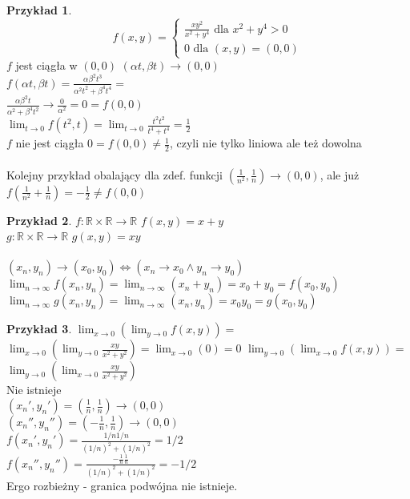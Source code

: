 \documentclass{article}
\theoremstyle{definition}
\theoremstyle{definition}
\theoremstyle{definition}
\newtheorem{pk}{Przykład}[subsection]
\theoremstyle{definition}
\theoremstyle{definition}
\theoremstyle{definition}
\theoremstyle{definition}
\begin{document}
\begin{pk}
    $$f(x,y)=\begin{cases}
        \frac{xy^2}{x^2+y^4} \text{ dla } x^2 + y^4 > 0\\
        0 \text { dla } (x,y) = (0,0)
    \end{cases}$$
    $f$ jest ciągła w $(0,0)$ $(\alpha t, \beta t) \rightarrow (0,0)$\\
    $f(\alpha t, \beta t) = \frac{\alpha \beta^2 t^3}{\alpha^2 t^2 + \beta^4 t^4}=$\\
    $\frac{\alpha \beta^2 t}{\alpha^2 + \beta^4 t^2} \rightarrow \frac{0}{\alpha^2} = 0 = f(0,0)$\\
    $\lim_{t\rightarrow 0} f(t^2,t) = \lim_{t\rightarrow 0} \frac{t^2 t^2}{t^4 + t^4} = \frac{1}{2}$\\
    $f$ nie jest ciągła $0=f(0,0)\neq \frac{1}{2}$, czyli nie tylko liniowa ale też dowolna\\\\
    Kolejny przykład obalający dla zdef. funkcji $\left(\frac{1}{n^2} , \frac{1}{n}\right) \rightarrow (0,0)$, ale już\\
    $f\left(\frac{1}{n^2} + \frac{1}{n}\right) = - \frac{1}{2} \neq f(0,0)$
\end{pk}

\begin{pk}
    $f: \mathbb{R} \times \mathbb{R} \rightarrow \mathbb{R}$
    $f(x,y) = x+y$\\
    $g: \mathbb{R} \times \mathbb{R} \rightarrow \mathbb{R}$
    $g(x,y) = xy$\\\\
    $(x_n,y_n) \rightarrow (x_0, y_0) \iff (x_n\rightarrow x_0 \land y_n \rightarrow y_0)$\\
    $\lim_{n\rightarrow \infty} f(x_n, y_n) = \lim_{n\rightarrow \infty} (x_n + y_n) = x_0 + y_0 = f(x_0, y_0)$\\
    $\lim_{n\rightarrow \infty} g(x_n, y_n) = \lim_{n\rightarrow \infty} (x_n, y_n) = x_0 y_0 = g(x_0, y_0)$\\
\end{pk}

\begin{pk}
    $\lim_{x\rightarrow 0} (\lim_{y\rightarrow 0} f(x,y)) =$\\
    $\lim_{x\rightarrow 0} (\lim_{y\rightarrow 0} \frac{xy}{x^2+y^2}) = \lim_{x\rightarrow 0} (0) = 0$
    $\lim_{y\rightarrow 0} (\lim_{x\rightarrow 0} f(x,y)) =$\\
    $\lim_{y\rightarrow 0} (\lim_{x\rightarrow 0} \frac{xy}{x^2+y^2})$\\
    Nie istnieje\\
    $(x_n', y_n') = (\frac{1}{n}, \frac{1}{n}) \rightarrow (0,0)$\\
    $(x_n'', y_n'') = (-\frac{1}{n}, \frac{1}{n}) \rightarrow (0,0)$\\
    $f(x_n', y_n') = \frac{1/n 1/n}{(1/n)^2 + (1/n)^2} = 1/2$\\
    $f(x_n'', y_n'') = \frac{-\frac{1}{n}\frac{1}{n}}{(1/n)^2 + (1/n)^2}=-1/2$\\
    Ergo rozbieżny - granica podwójna nie istnieje.
\end{pk}
\end{document}
